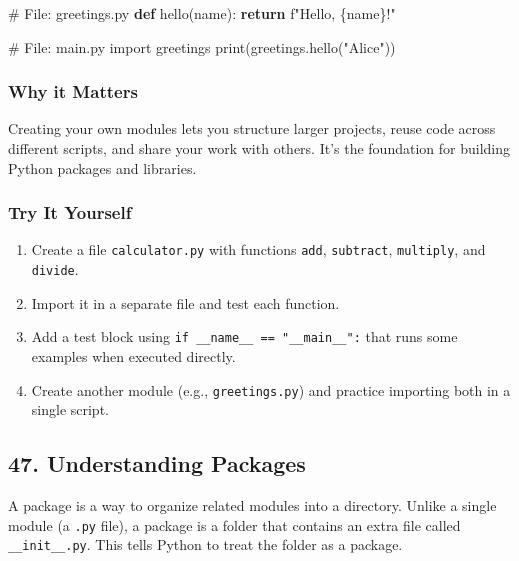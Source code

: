 \documentclass[
  letterpaper,
  DIV=11,
  numbers=noendperiod]{scrreprt}
\newenvironment{Shaded}{\begin{snugshade}}{\end{snugshade}}
\newcommand{\BuiltInTok}[1]{\textcolor[rgb]{0.00,0.23,0.31}{#1}}
\newcommand{\CommentTok}[1]{\textcolor[rgb]{0.37,0.37,0.37}{#1}}
\newcommand{\ControlFlowTok}[1]{\textcolor[rgb]{0.00,0.23,0.31}{\textbf{#1}}}
\newcommand{\ImportTok}[1]{\textcolor[rgb]{0.00,0.46,0.62}{#1}}
\newcommand{\KeywordTok}[1]{\textcolor[rgb]{0.00,0.23,0.31}{\textbf{#1}}}
\newcommand{\NormalTok}[1]{\textcolor[rgb]{0.00,0.23,0.31}{#1}}
\newcommand{\SpecialCharTok}[1]{\textcolor[rgb]{0.37,0.37,0.37}{#1}}
\newcommand{\SpecialStringTok}[1]{\textcolor[rgb]{0.13,0.47,0.30}{#1}}
\newcommand{\StringTok}[1]{\textcolor[rgb]{0.13,0.47,0.30}{#1}}
\providecommand{\tightlist}{%
  \setlength{\itemsep}{0pt}\setlength{\parskip}{0pt}}
\begin{document}
\begin{Shaded}
\begin{Highlighting}[]
\CommentTok{\# File: greetings.py}
\KeywordTok{def}\NormalTok{ hello(name):}
    \ControlFlowTok{return} \SpecialStringTok{f"Hello, }\SpecialCharTok{\{}\NormalTok{name}\SpecialCharTok{\}}\SpecialStringTok{!"}

\CommentTok{\# File: main.py}
\ImportTok{import}\NormalTok{ greetings}
\BuiltInTok{print}\NormalTok{(greetings.hello(}\StringTok{"Alice"}\NormalTok{))}
\end{Highlighting}
\end{Shaded}

\subsubsection{Why it Matters}\label{why-it-matters-45}

Creating your own modules lets you structure larger projects, reuse code
across different scripts, and share your work with others. It's the
foundation for building Python packages and libraries.

\subsubsection{Try It Yourself}\label{try-it-yourself-45}

\begin{enumerate}
\def\labelenumi{\arabic{enumi}.}
\tightlist
\item
  Create a file \texttt{calculator.py} with functions \texttt{add},
  \texttt{subtract}, \texttt{multiply}, and \texttt{divide}.
\item
  Import it in a separate file and test each function.
\item
  Add a test block using \texttt{if\ \_\_name\_\_\ ==\ "\_\_main\_\_":}
  that runs some examples when executed directly.
\item
  Create another module (e.g., \texttt{greetings.py}) and practice
  importing both in a single script.
\end{enumerate}

\subsection{47. Understanding Packages}\label{understanding-packages}

A package is a way to organize related modules into a directory. Unlike
a single module (a \texttt{.py} file), a package is a folder that
contains an extra file called \texttt{\_\_init\_\_.py}. This tells
Python to treat the folder as a package.
\end{document}
